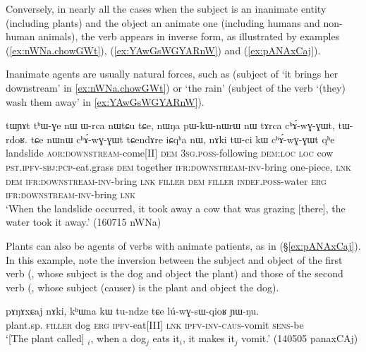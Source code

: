 Conversely, in nearly all the cases when the subject is an inanimate entity (including plants) and the object an animate one (including humans and non-human animals), the verb appears in inverse form, as illustrated by examples (\ref{ex:nWNa.chowGWt}), (\ref{ex:YAwGsWGYARnW}) and (\ref{ex:pANAxCaj}). 

Inanimate agents are usually natural forces, such as  (subject of  `it brings her downstream' in \ref{ex:nWNa.chowGWt}) or  `the rain'  (subject of the verb  `(they) wash them away' in \ref{ex:YAwGsWGYARnW}).   
 
\begin{exe}
\ex \label{ex:nWNa.chowGWt} 
\gll tɯɲɤt tʰɯ-ɣe nɯ ɯ-rca nɯtɕu tɕe, nɯŋa pɯ-kɯ-nɯrɯ nɯ tɤrca cʰɤ́-wɣ-ɣɯt, tɯ-rdoʁ. tɕe nɯnɯ cʰɤ́-wɣ-ɣɯt tɕendɤre iɕqʰa nɯ, nɤki tɯ-ci kɯ cʰɤ́-wɣ-ɣɯt qʰe \\
landslide \textsc{aor}:\textsc{downstream}-come[II] \textsc{dem} \textsc{3sg}.\textsc{poss}-following \textsc{dem}:\textsc{loc} \textsc{loc} cow  \textsc{pst}.\textsc{ipfv}-\textsc{sbj}:\textsc{pcp}-eat.grass \textsc{dem} together \textsc{ifr}:\textsc{downstream}-\textsc{inv}-bring one-piece, \textsc{lnk} \textsc{dem} \textsc{ifr}:\textsc{downstream}-\textsc{inv}-bring \textsc{lnk} \textsc{filler} \textsc{dem} \textsc{filler} \textsc{indef}.\textsc{poss}-water \textsc{erg} \textsc{ifr}:\textsc{downstream}-\textsc{inv}-bring  \textsc{lnk} \\
\glt `When the landslide occurred, it took away a cow that was grazing [there], the water took it away.' (160715 nWNa) 	
\end{exe}

Plants can also be agents of verbs with animate patients, as in (§\ref{ex:pANAxCaj}). In this example, note the inversion between the subject and object of the first verb (, whose subject is the dog and object the plant) and those of the second verb (, whose subject (causer) is the plant and object the dog).

\begin{exe}
\ex \label{ex:pANAxCaj} 
\gll pɤŋɤxɕaj nɤki, kʰɯna kɯ tu-ndze tɕe lú-wɣ-sɯ-qioʁ ɲɯ-ŋu. \\
plant.sp. \textsc{filler} dog \textsc{erg} \textsc{ipfv}-eat[III] \textsc{lnk} \textsc{ipfv}-\textsc{inv}-\textsc{caus}-vomit \textsc{sens}-be \\
\glt `[The plant called] $_i$, when a dog$_j$ eats it$_i$, it makes it$_j$ vomit.' (140505 panaxCAj)
\end{exe}

